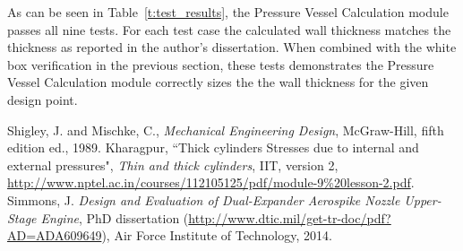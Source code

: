 \documentclass{article}
\begin{document}
As can be seen in Table~\ref{t:test_results}, the Pressure Vessel Calculation module passes all nine tests.  For each test case the calculated wall thickness matches the thickness as reported in the author's dissertation.  When combined with the white box verification in the previous section, these tests demonstrates the Pressure Vessel Calculation module correctly sizes the the wall thickness for the given design point.


\begin{thebibliography}{9}

 Shigley, J. and Mischke, C., \emph{Mechanical Engineering Design}, McGraw-Hill, fifth edition ed., 1989.
 Kharagpur, ``Thick cylinders Stresses due to internal and external pressures", \emph{Thin and thick cylinders}, IIT, version 2, \url{http://www.nptel.ac.in/courses/112105125/pdf/module-9\%20lesson-2.pdf}.
 Simmons, J. \textit{Design and Evaluation of Dual-Expander Aerospike Nozzle Upper-Stage Engine}, PhD dissertation (\url{http://www.dtic.mil/get-tr-doc/pdf?AD=ADA609649}), Air Force Institute of Technology, 2014.

\end{thebibliography}
\end{document}
